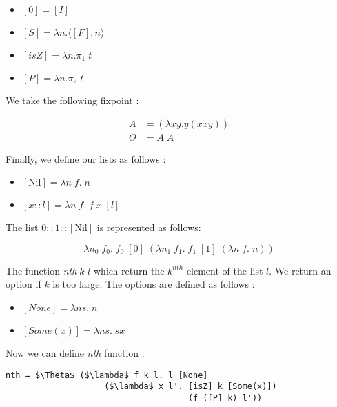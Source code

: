 \documentclass{article}
\theoremstyle{plain}
\newcommand{\nil}{[\text{Nil}]}
\newcommand{\nth}{\textit{nth}}
\begin{document}
  \begin{multicols}{2}
    \begin{itemize}
      \item $[0] = [I]$
      \item $[S] = \lambda n. \langle [F], n\rangle$
      \item $[\textit{isZ}] = \lambda n. \pi_1\;t$
      \item $[P] = \lambda n. \pi_2\;t$
    \end{itemize}
  \end{multicols}

  We take the following fixpoint :

  \begin{align*}
    A &= (\lambda xy.y(xxy)) \\
    \Theta &= A\;A
  \end{align*}

  Finally, we define our lists as follows :

  \begin{itemize}
    \item $\nil = \lambda n\;f.\; n$
    \item $[x :: l] = \lambda n\;f.\; f\; x\; [l]$
  \end{itemize}

  \begin{center}
    The list $0 :: 1 :: \nil$ is represented as follows:
  \end{center}
  $$\lambda n_0\; f_0.\; f_0\; [0]\; (\lambda n_1\;f_1.\; f_1\;[1]\;(\lambda
  n\;f.\;n))$$

  The function \nth $\;k$ $l$ which return the
  $k^{nth}$ element of the list $l$. We return an option if $k$ is too large.
  The options are defined as follows :

  \begin{itemize}
    \item $[\textit{None}] = \lambda n s.\;n$
    \item $[\textit{Some}(x)] = \lambda n s.\;s x$
  \end{itemize}

  Now we can define \textit{nth} function :

    \begin{lstlisting}[caption=Nth function on list, mathescape=true]
nth = $\Theta$ ($\lambda$ f k l. l [None]
                    ($\lambda$ x l'. [isZ] k [Some(x)])
                                     (f ([P] k) l'))
    \end{lstlisting}
\end{document}
